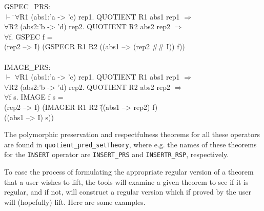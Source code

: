 \documentclass[envcountsame,runningheads]{llncs}
\begin{document}
{\tt \begin{tabbing}
GSPEC\_PRS: \\
\hspace{1.5mm}
    $\vdash$ \=$\forall$R\=1 (abs1:'a -> 'c) rep1. QUOTIENT R1 abs1 rep1 $\Rightarrow$ \\
\>           $\forall$R2 (abs2:'b -> 'd) rep2. QUOTIENT R2 abs2 rep2 $\Rightarrow$ \\
\>\>     $\forall$f. \=GSPEC f = \\
\>\>\>     (rep2 --> I) (GSPECR R1 R2 ((abs1 --> (rep2 \#\# I)) f)) \\
\\
IMAGE\_PRS: \\
\hspace{1.5mm}
    $\vdash$ $\forall$R1 (abs1:'a -> 'c) rep1. QUOTIENT R1 abs1 rep1 $\Rightarrow$ \\
\>           $\forall$R2 (abs2:'b -> 'd) rep2. QUOTIENT R2 abs2 rep2 $\Rightarrow$ \\
\>\>     $\forall$f s. IMAGE f s = \\
\>\>\>     (rep2 --> I) (IMAGER R1 R2 \=((abs1 --> rep2) f) \\
\>\>\>\>                                ((abs1 --> I) s))
\end{tabbing}}

The polymorphic preservation and respectfulness theorems for all these
operators are found in {\tt quotient\_pred\_setTheory}, where e.g. the
names of these theorems for the {\tt INSERT} operator are
{\tt INSERT\_PRS} and {\tt INSERTR\_RSP}, respectively.

To ease the process of formulating the appropriate regular version of a 
theorem that a user wishes to lift, the tools will examine a given
theorem to see if it is regular, and if not, will construct a regular
version which if proved by the user will (hopefully) lift.
Here are some examples.
\end{document}
